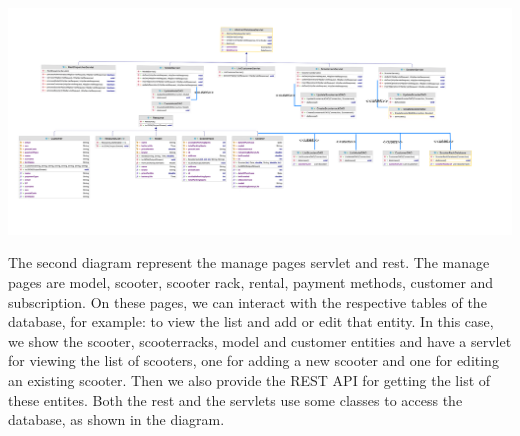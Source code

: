\includegraphics[scale=0.25]{sections/DLL/manage-servlet-rest.jpeg}

The second diagram represent the manage pages servlet and rest. The manage pages are model, scooter, scooter rack, rental, payment methods, customer and subscription. On these pages, we can interact with the respective tables of the database, for example: to view the list and add or edit that entity. In this case, we show the scooter, scooterracks, model and customer entities and have a servlet for viewing the list of scooters, one for adding a new scooter and one for editing an existing scooter. Then we also provide the REST API for getting the list of these entites. Both the rest and the servlets use some classes to access the database, as shown in the diagram. 